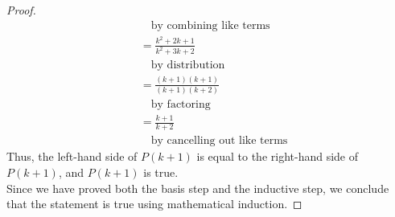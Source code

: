 \documentclass[name=Ojas\ Chaturvedi, emailid=oj.chaturvedi.2024, course=Capstone:\ Discrete\ Math, num=8, deadline={November\ 2,\ 2023}]{homework}
\begin{document}
\begin{proof}
\begin{align*}
        & \quad \text{by combining like terms} \\
        &= \frac{k^2 +2k + 1}{k^2 + 3k + 2} \\
        & \quad \text{by distribution} \\
        &= \frac{(k+1)(k+1)}{(k+1)(k+2)} \\
        & \quad \text{by factoring}\\
        &= \frac{k+1}{k+2} \\
        & \quad \text{by cancelling out like terms}
    \end{align*}
    Thus, the left-hand side of $P(k+1)$ is equal to the right-hand side of $P(k+1)$, and $P(k+1)$ is true. \\
    Since we have proved both the basis step and the inductive step, we conclude that the statement is true using mathematical induction.
\end{proof}
\end{document}

